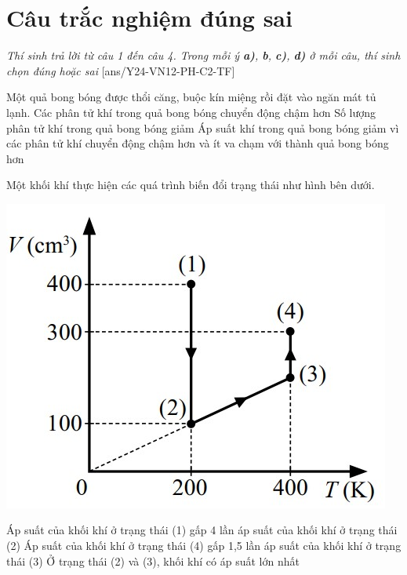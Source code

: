 \section{Câu trắc nghiệm đúng sai}
\textit{Thí sinh trả lời từ câu 1 đến câu 4. Trong mỗi ý \textbf{a)}, \textbf{b}, \textbf{c)}, \textbf{d)} ở mỗi câu, thí sinh chọn đúng hoặc sai}
\setcounter{ex}{0}
[ans/Y24-VN12-PH-C2-TF]
\begin{ex}
	Một quả bong bóng được thổi căng, buộc kín miệng rồi đặt vào ngăn mát tủ lạnh.
	{\True Các phân tử khí trong quả bong bóng chuyển động chậm hơn}
	{Số lượng phân tử khí trong quả bong bóng giảm}
	{\True Áp suất khí trong quả bong bóng giảm vì các phân tử khí chuyển động chậm hơn và ít va chạm với thành quả bong bóng hơn}
	\loigiai{}
\end{ex}
\begin{ex}
	Một khối khí thực hiện các quá trình biến đổi trạng thái như hình bên dưới.
	\begin{center}
		\includegraphics[width=0.35\linewidth]{../figs/G12C2-5}
	\end{center}
	{Áp suất của khối khí ở trạng thái (1) gấp 4 lần áp suất của khối khí ở trạng thái (2)}
	{Áp suất của khối khí ở trạng thái (4) gấp 1,5 lần áp suất của khối khí ở trạng thái (3)}
	{\True Ở trạng thái (2) và (3), khối khí có áp suất lớn nhất}
	\loigiai{}
\end{ex}
